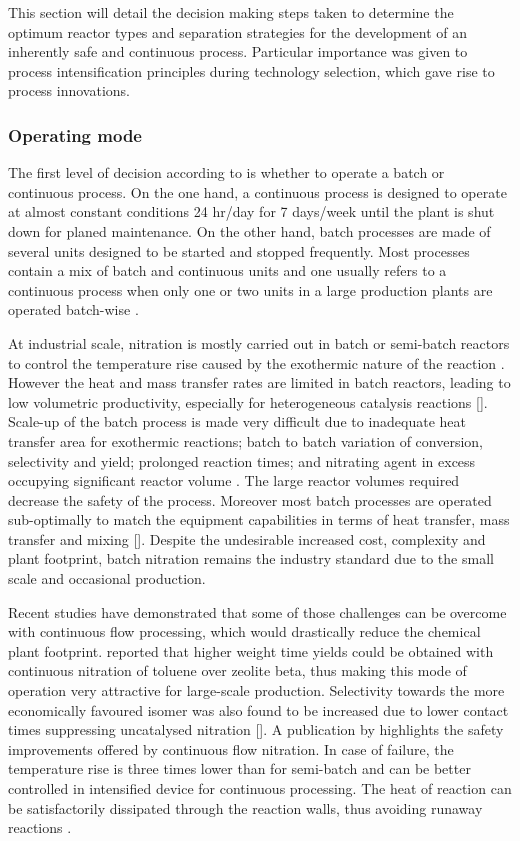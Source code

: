 This section will detail the decision making steps taken to determine the optimum reactor types and separation strategies for the development of an inherently safe and continuous process. Particular importance was given to process intensification principles during technology selection, which gave rise to process innovations.


\subsubsection{Operating mode} %
The first level of decision according to \textcite{douglas_conceptual_1988} is whether to operate a batch or continuous process. On the one hand, a continuous process is designed to operate at almost constant conditions 24 hr/day for 7 days/week until the plant is shut down for planed maintenance. On the other hand, batch processes are made of several units designed to be started and stopped frequently. Most processes contain a mix of batch and continuous units and one usually refers to a continuous process when only one or two units in a large production plants are operated batch-wise \cite{douglas_conceptual_1988}. 

At industrial scale, nitration is mostly carried out in batch or semi-batch reactors to control the temperature rise caused by the exothermic nature of the reaction \cite{booth_nitro_2000,dugal_nitrobenzene_2005}. However the heat and mass transfer rates are limited in batch reactors, leading to low volumetric productivity, especially for heterogeneous catalysis reactions []. Scale-up of the batch process is made very difficult due to inadequate heat transfer area for exothermic reactions; batch to batch variation of conversion, selectivity and yield; prolonged reaction times; and nitrating agent in excess occupying significant reactor volume \cite{kulkarni_continuous_2014}. The large reactor volumes required decrease the safety of the process. Moreover most batch processes are operated sub-optimally to match the equipment capabilities in terms of heat transfer, mass transfer and mixing []. Despite the undesirable increased cost, complexity and plant footprint, batch nitration remains the industry standard due to the small scale and occasional production. 

Recent studies have demonstrated that some of those challenges can be overcome with continuous flow processing, which would drastically reduce the chemical plant footprint. \textcite{} reported that higher weight time yields could be obtained with continuous nitration of toluene over zeolite beta, thus making this mode of operation very attractive for large-scale production. Selectivity towards the more economically favoured \para isomer was also found to be increased due to lower contact times suppressing uncatalysed nitration []. A publication by \textcite{di_miceli_raimondi_safety_2015} highlights the safety improvements offered by continuous flow nitration. In case of failure, the temperature rise is three times lower than for semi-batch and can be better controlled in intensified device for continuous processing. The heat of reaction can be satisfactorily dissipated through the reaction walls, thus avoiding runaway reactions \cite{di_miceli_raimondi_safety_2015}. 

